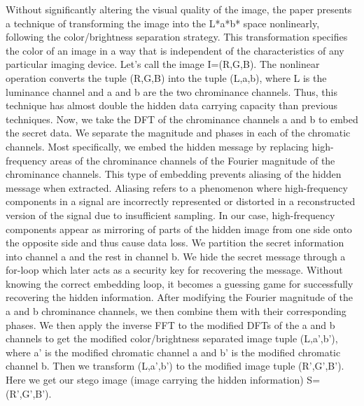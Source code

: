 Without significantly altering the visual quality of the image, the paper presents a technique of transforming the image into the L*a*b* space nonlinearly, following the color/brightness separation strategy. This transformation specifies the color of an image in a way that is independent of the characteristics of any particular imaging device. Let's call the image I=(R,G,B). The nonlinear operation converts the tuple (R,G,B) into the tuple (L,a,b), where L is the luminance channel and a and b are the two chrominance channels. Thus, this technique has almost double the hidden data carrying capacity than previous techniques. Now, we take the DFT of the chrominance channels a and b to embed the secret data. We separate the magnitude and phases in each of the chromatic channels. Most specifically, we embed the hidden message by replacing high-frequency areas of the chrominance channels of the Fourier magnitude of the chrominance channels. This type of embedding prevents aliasing of the hidden message when extracted. Aliasing refers to a phenomenon where high-frequency components in a signal are incorrectly represented or distorted in a reconstructed version of the signal due to insufficient sampling. In our case, high-frequency components appear as mirroring of parts of the hidden image from one side onto the opposite side and thus cause data loss. We partition the secret information into channel a and the rest in channel b. We hide the secret message through a for-loop which later acts as a security key for recovering the message. Without knowing the correct embedding loop, it becomes a guessing game for successfully recovering the hidden information. After modifying the Fourier magnitude of the a and b chrominance channels, we then combine them with their corresponding phases. We then apply the inverse FFT to the modified DFTs of the a and b channels to get the modified color/brightness separated image tuple (L,a',b'), where a' is the modified chromatic channel a and b' is the modified chromatic channel b. Then we transform (L,a',b') to the modified image tuple (R',G',B'). Here we get our stego image (image carrying the hidden information) S=(R',G',B').

